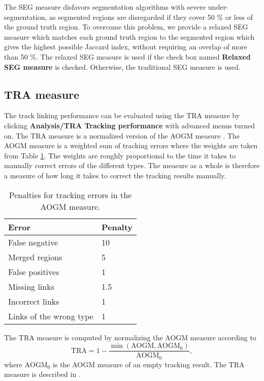 \documentclass[a4paper, oneside, onecolumn, 11pt]{article}
\newcommand{\menu}[1]{\textbf{#1}}
\newcommand{\control}[1]{\textbf{#1}}
\begin{document}
The SEG measure disfavors segmentation algorithms with severe under-segmentation, as segmented regions are disregarded if they cover 50 \% or less of the ground truth region. To overcome this problem, we provide a relaxed SEG measure which matches each ground truth region to the segmented region which gives the highest possible Jaccard index, without requiring an overlap of more than 50 \%. The relaxed SEG measure is used if the check box named \control{Relaxed SEG measure} is checked. Otherwise, the traditional SEG measure is used.

\subsection{TRA measure}
The track linking performance can be evaluated using the TRA measure by clicking \menu{Analysis/TRA Tracking performance} with advanced menus turned on. The TRA measure is a normalized version of the AOGM measure \cite{Matula15Accuracy}. The AOGM measure is a weighted sum of tracking errors where the weights are taken from Table \ref{tab:TRA-penalties}. The weights are roughly proportional to the time it takes to manually correct errors of the different types. The measure as a whole is therefore a measure of how long it takes to correct the tracking results manually.

\begin{table}
  \centering
  \caption{Penalties for tracking errors in the AOGM measure.}\label{tab:TRA-penalties}
  \begin{tabular}{ll}
    Error & Penalty \\
    \hline
    False negative & 10 \\
    Merged regions & 5 \\
    False positives & 1 \\
    Missing links & 1.5 \\
    Incorrect links & 1 \\
    Links of the wrong type & 1
  \end{tabular}
\end{table}

The TRA measure is computed by normalizing the AOGM measure according to
\begin{equation}
\text{TRA} = 1 - \frac{\min(\text{AOGM},\text{AOGM}_0)}{\text{AOGM}_0},
\end{equation}
where $\text{AOGM}_0$ is the AOGM measure of an empty tracking result. The TRA measure is described in \cite{Ortiz15Challenge, Ulman17Objective}.
\end{document}

